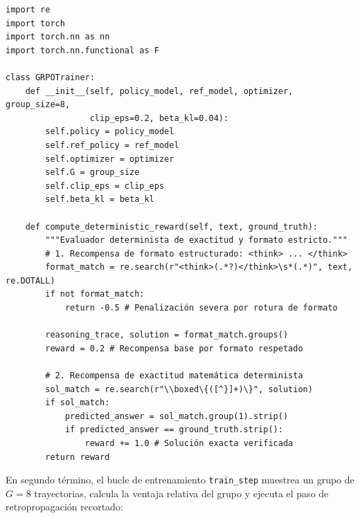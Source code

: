 \begin{tcolorbox}[colback=bg_marfil, colframe=unmsm_gold, arc=3pt, boxrule=0.6pt, top=0.2cm, bottom=0.2cm, left=0.4cm, right=0.4cm]
\scriptsize\ttfamily
\begin{verbatim}
import re
import torch
import torch.nn as nn
import torch.nn.functional as F

class GRPOTrainer:
    def __init__(self, policy_model, ref_model, optimizer, group_size=8, 
                 clip_eps=0.2, beta_kl=0.04):
        self.policy = policy_model
        self.ref_policy = ref_model
        self.optimizer = optimizer
        self.G = group_size
        self.clip_eps = clip_eps
        self.beta_kl = beta_kl

    def compute_deterministic_reward(self, text, ground_truth):
        """Evaluador determinista de exactitud y formato estricto."""
        # 1. Recompensa de formato estructurado: <think> ... </think>
        format_match = re.search(r"<think>(.*?)</think>\s*(.*)", text, re.DOTALL)
        if not format_match:
            return -0.5 # Penalización severa por rotura de formato
        
        reasoning_trace, solution = format_match.groups()
        reward = 0.2 # Recompensa base por formato respetado
        
        # 2. Recompensa de exactitud matemática determinista
        sol_match = re.search(r"\\boxed\{([^}]+)\}", solution)
        if sol_match:
            predicted_answer = sol_match.group(1).strip()
            if predicted_answer == ground_truth.strip():
                reward += 1.0 # Solución exacta verificada
        return reward
\end{verbatim}
\end{tcolorbox}

En segundo término, el bucle de entrenamiento \texttt{train\_step} muestrea un grupo de $G=8$ trayectorias, calcula la ventaja relativa del grupo y ejecuta el paso de retropropagación recortado:

